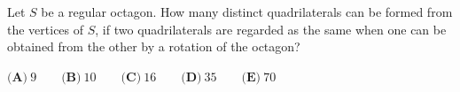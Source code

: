 Let $S$ be a regular octagon. How many distinct quadrilaterals can be formed from the vertices of $S$, if two quadrilaterals are regarded as the same when one can be obtained from the other by a rotation of the octagon?

$\textbf{(A)}\ 9 \qquad\textbf{(B)}\ 10 \qquad\textbf{(C)}\ 16 \qquad\textbf{(D)}\ 35 \qquad\textbf{(E)}\ 70$
